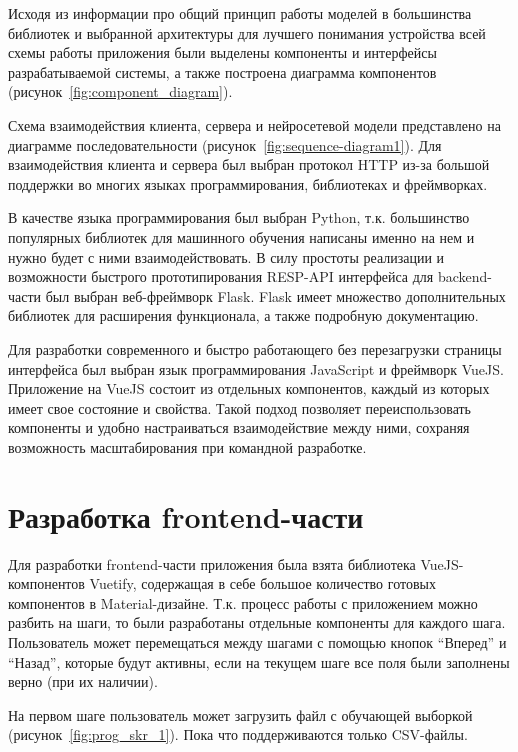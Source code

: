 Исходя из информации про общий принцип работы моделей в большинства библиотек и выбранной архитектуры для лучшего понимания устройства всей схемы работы приложения были выделены компоненты и интерфейсы разрабатываемой системы, а также построена диаграмма компонентов (рисунок~\ref{fig:component_diagram}).




Схема взаимодействия клиента, сервера и нейросетевой модели представлено на диаграмме последовательности (рисунок~\ref{fig:sequence-diagram1}). Для взаимодействия клиента и сервера был выбран протокол HTTP из-за большой поддержки во многих языках программирования, библиотеках и фреймворках.




В качестве языка программирования был выбран Python, т.к. большинство популярных библиотек для машинного обучения написаны именно на нем и нужно будет с ними взаимодействовать. В силу простоты реализации и возможности быстрого прототипирования RESP-API интерфейса для backend-части был выбран веб-фреймворк Flask. Flask имеет множество дополнительных библиотек для расширения функционала, а также подробную документацию.


Для разработки современного и быстро работающего без перезагрузки страницы интерфейса был выбран язык программирования JavaScript и фреймворк VueJS. Приложение на VueJS состоит из отдельных компонентов, каждый из которых имеет свое состояние и свойства. Такой подход позволяет переиспользовать компоненты и удобно настраиваться взаимодействие между ними, сохраняя возможность масштабирования при командной разработке.

\section{Разработка frontend-части}

Для разработки frontend-части приложения была взята библиотека VueJS-компонентов Vuetify, содержащая в себе большое количество готовых компонентов в Material-дизайне. Т.к. процесс работы с приложением можно разбить на шаги, то были разработаны отдельные компоненты для каждого шага. Пользователь может перемещаться между шагами с помощью кнопок “Вперед” и “Назад”, которые будут активны, если на текущем шаге все поля были заполнены верно (при их наличии).


На первом шаге пользователь может загрузить файл с обучающей выборкой (рисунок~\ref{fig:prog_skr_1}). Пока что поддерживаются только CSV-файлы.


